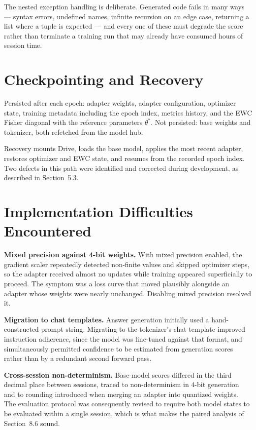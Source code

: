 \documentclass[12pt,a4paper]{report}
\begin{document}
The nested exception handling is deliberate. Generated code fails in many ways --- syntax errors, undefined names, infinite recursion on an edge case, returning a list where a tuple is expected --- and every one of these must degrade the score rather than terminate a training run that may already have consumed hours of session time.

\section{Checkpointing and Recovery}

Persisted after each epoch: adapter weights, adapter configuration, optimizer state, training metadata including the epoch index, metrics history, and the EWC Fisher diagonal with the reference parameters $\theta^*$. Not persisted: base weights and tokenizer, both refetched from the model hub.

Recovery mounts Drive, loads the base model, applies the most recent adapter, restores optimizer and EWC state, and resumes from the recorded epoch index. Two defects in this path were identified and corrected during development, as described in Section~5.3.

\section{Implementation Difficulties Encountered}

\textbf{Mixed precision against 4-bit weights.} With mixed precision enabled, the gradient scaler repeatedly detected non-finite values and skipped optimizer steps, so the adapter received almost no updates while training appeared superficially to proceed. The symptom was a loss curve that moved plausibly alongside an adapter whose weights were nearly unchanged. Disabling mixed precision resolved it.

\textbf{Migration to chat templates.} Answer generation initially used a hand-constructed prompt string. Migrating to the tokenizer's chat template improved instruction adherence, since the model was fine-tuned against that format, and simultaneously permitted confidence to be estimated from generation scores rather than by a redundant second forward pass.

\textbf{Cross-session non-determinism.} Base-model scores differed in the third decimal place between sessions, traced to non-determinism in 4-bit generation and to rounding introduced when merging an adapter into quantized weights. The evaluation protocol was consequently revised to require both model states to be evaluated within a single session, which is what makes the paired analysis of Section~8.6 sound.
\end{document}
